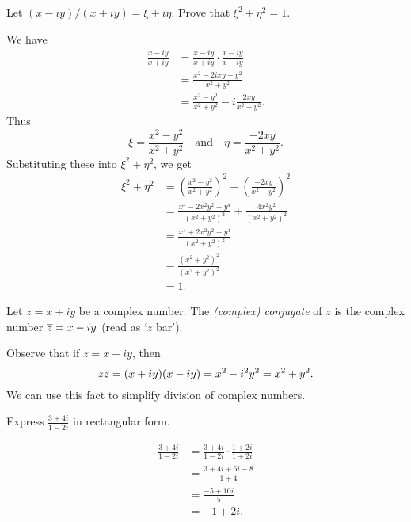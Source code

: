 \begin{example}
    Let \((x - iy)/(x + iy) = \xi + i\eta\). Prove that \(\xi^2 + \eta^2 = 1\).

    \begin{solution}
        We have
        \[
            \begin{aligned}
                \frac{x - iy}{x + iy} &= \frac{x - iy}{x + iy} \cdot \frac{x - iy}{x - iy} \\
                &= \frac{
                    x^2 - 2ixy - y^2
                }{
                    x^2 + y^2
                } \\
                &= \frac{x^2 - y^2}{x^2 + y^2} - i\frac{2xy}{x^2 + y^2}.
            \end{aligned}
        \]
        Thus
        \[
            \xi = \frac{x^2 - y^2}{x^2 + y^2} \quad \text{and} \quad \eta = \frac{-2xy}{x^2 + y^2}.
        \]
        Substituting these into \(\xi^2 + \eta^2\), we get
        \[
            \begin{aligned}
                \xi^2 + \eta^2 &= \left(\frac{x^2 - y^2}{x^2 + y^2}\right)^2 + \left(\frac{-2xy}{x^2 + y^2}\right)^2 \\
                &= \frac{x^4 - 2x^2y^2 + y^4}{(x^2 + y^2)^2} + \frac{4x^2y^2}{(x^2 + y^2)^2} \\
                &= \frac{x^4 + 2x^2y^2 + y^4}{(x^2 + y^2)^2} \\
                &= \frac{(x^2 + y^2)^2}{(x^2 + y^2)^2} \\
                &= 1.
            \end{aligned}
        \]
    \end{solution}
\end{example}

\begin{definition}
    Let \(z = x + iy\) be a complex number. The \emph{(complex) conjugate} of \(z\) is the complex number \(\overline{z} = x - iy\) (read as `\(z\) bar').
    \label{def:conjugate}
\end{definition}

Observe that if \(z = x + iy\), then
\[
    z\overline{z} = (x + iy)(x - iy) = x^2 - i^2y^2 = x^2 + y^2.
\]
We can use this fact to simplify division of complex numbers.

\begin{example}
    Express \(\displaystyle\frac{3 + 4i}{1 - 2i}\) in rectangular form.

    \begin{solution}
        \[
            \begin{aligned}
                \frac{3 + 4i}{1 - 2i} &= \frac{3 + 4i}{1 - 2i} \cdot \frac{1 + 2i}{1 + 2i} \\
                &= \frac{3 + 4i + 6i - 8}{1 + 4} \\
                &= \frac{-5 + 10i}{5} \\
                &= -1 + 2i.
            \end{aligned}
        \]
    \end{solution}
\end{example}

